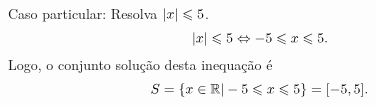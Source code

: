\begin{exem}
\begin{comment}
\begin{equation*}
\abs{x} < a \Leftrightarrow \abs{x}^2 < a^2 \Leftrightarrow x^2 < a^2
\end{equation*}
   mas,
\begin{equation*}
x^2 < a^2 \Leftrightarrow x^2 - a^2 < 0 \Leftrightarrow (x-a)(x+a) < 0 \ .
\end{equation*}
   Vamos então analisar quando $(x-a)(x+a) < 0$. Lembremos que produto de dois números é negativo quando um deles for negativo e o outro positivo, com isso a inequação $(x-a)(x+a) < 0$ é satisfeita em duas situações:\\
   Caso 1: $x-a<0$ e $x+a>0$
\begin{equation*}
x-a<0 \Rightarrow x< a
\end{equation*}
   e
\begin{equation*}
x+a>0 \Rightarrow x>-a \Rightarrow -a< x
\end{equation*}
  Fazendo a interseção dos conjuntos $A_1= \left\{ x \in \R \mid x<a \right\}$ e $B_1= \left\{ x \in \R \mid -a<x \right\}$, obtemos $A_1 \cap B_1= \left\{ x \in \R \mid -a< x <a \right\}$. O conjunto $A_1 \cap B_1$ é o conjunto solução da inequação neste caso.


   Caso 2: $x-a>0$ e $x+a<0$
\begin{equation*}
x-a> 0 \Rightarrow x> a
\end{equation*}
   e
\begin{equation*}
x+a< 0 \Rightarrow x<-a
\end{equation*}
   Fazendo a interseção dos conjuntos $A_2= \left\{ x \in \R \mid x> a \right\}$ e $B_2= \left\{ x \in \R \mid x<-a \right\}$, obtemos $A_2 \cap B_2= \emptyset$. Portanto neste caso a inequação não possui solução.

  Portanto $\abs{x} < a \Leftrightarrow -a< x <a$.
\end{comment}
  \end{exem}
  
\begin{exem}
   Caso particular: Resolva $\left|x\right| \leqslant 5$.
\begin{equation*}
\left|x\right| \leqslant 5 \Leftrightarrow -5 \leqslant x \leqslant 5.
\end{equation*}
  Logo, o conjunto solução desta inequação é
\begin{equation*}
S=\{x \in \mathbb{R}| -5 \leqslant x \leqslant 5\} = [-5, 5]. 
\end{equation*}
\end{exem}

